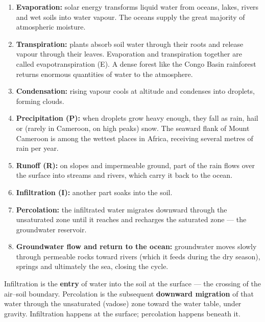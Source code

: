 \documentclass[11pt]{article}
\newcommand{\cle}[1]{{\popxbold\color{popdark}#1}}
\begin{document}
\begin{enumerate}
\item \textbf{Evaporation:} solar energy transforms liquid water from oceans, lakes, rivers and wet soils into water vapour. The oceans supply the great majority of atmospheric moisture.
\item \textbf{Transpiration:} plants absorb soil water through their roots and release vapour through their leaves. Evaporation and transpiration together are called \cle{evapotranspiration} (E). A dense forest like the Congo Basin rainforest returns enormous quantities of water to the atmosphere.
\item \textbf{Condensation:} rising vapour cools at altitude and condenses into droplets, forming clouds.
\item \textbf{Precipitation (P):} when droplets grow heavy enough, they fall as rain, hail or (rarely in Cameroon, on high peaks) snow. The seaward flank of Mount Cameroon is among the wettest places in Africa, receiving several metres of rain per year.
\item \textbf{Runoff (R):} on slopes and impermeable ground, part of the rain flows over the surface into streams and rivers, which carry it back to the ocean.
\item \textbf{Infiltration (I):} another part soaks into the soil.
\item \textbf{Percolation:} the infiltrated water migrates downward through the unsaturated zone until it reaches and recharges the saturated zone --- the groundwater reservoir.
\item \textbf{Groundwater flow and return to the ocean:} groundwater moves slowly through permeable rocks toward rivers (which it feeds during the dry season), springs and ultimately the sea, closing the cycle.
\end{enumerate}

\begin{definition}
\cle{Infiltration} is the \textbf{entry} of water into the soil at the surface --- the crossing of the air--soil boundary. \cle{Percolation} is the subsequent \textbf{downward migration} of that water through the unsaturated (vadose) zone toward the water table, under gravity. Infiltration happens at the surface; percolation happens beneath it.
\end{definition}
\end{document}
